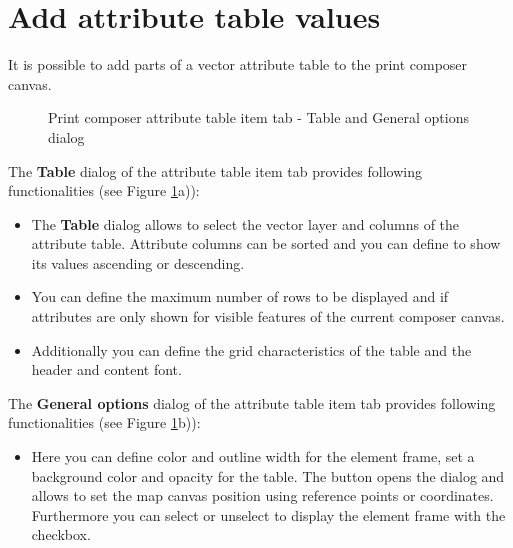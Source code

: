 \section{Add attribute table values}

It is possible to add parts of a vector attribute table to the print composer canvas.

\begin{figure}[ht]
\centering
{}
\hspace{1cm}
\caption{Print composer attribute table item tab - Table and General options dialog \nixcaption}\label{fig:attrcomp}
\end{figure}


The \textbf{Table} dialog of the attribute table item tab provides following
functionalities (see Figure \ref{fig:attrcomp}a)):

\begin{itemize}[label=--]
\item The \textbf{Table} dialog allows to select the vector layer and columns of
the attribute table. Attribute columns can be sorted and you can define to show 
its values ascending or descending. 
\item You can define the maximum number of rows to be displayed
and if attributes are only shown for visible features of the current composer
canvas. 
\item Additionally you can define the grid characteristics of the table and
the header and content font.
\end{itemize}


The \textbf{General options} dialog of the attribute table item tab
provides following functionalities (see Figure \ref{fig:attrcomp}b)):

\begin{itemize}[label=--]
\item Here you can define color and outline width for the element frame, set
a background color and opacity for the table. The 
button opens the  dialog and allows to set the map
canvas position using reference points or coordinates. Furthermore you can
select or unselect to display the element frame with the  checkbox.
\end{itemize}

